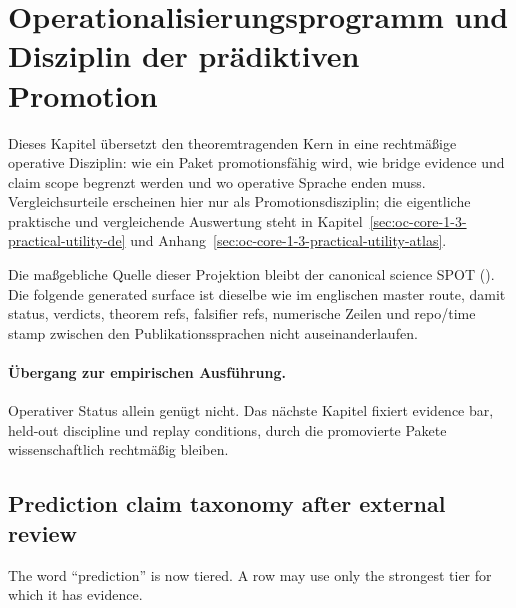 \section{Operationalisierungsprogramm und Disziplin der prädiktiven Promotion}
\label{sec:oc-core-1-3-operationalization-program-de}

Dieses Kapitel übersetzt den theoremtragenden Kern in eine rechtmäßige
operative Disziplin: wie ein Paket promotionsfähig wird, wie bridge evidence
und claim scope begrenzt werden und wo operative Sprache enden muss.
Vergleichsurteile erscheinen hier nur als Promotionsdisziplin; die eigentliche
praktische und vergleichende Auswertung steht in
Kapitel~\ref{sec:oc-core-1-3-practical-utility-de} und
Anhang~\ref{sec:oc-core-1-3-practical-utility-atlas}.

Die maßgebliche Quelle dieser Projektion bleibt der canonical science SPOT
(). Die folgende generated surface ist
dieselbe wie im englischen master route, damit status, verdicts, theorem refs,
falsifier refs, numerische Zeilen und repo/time stamp zwischen den
Publikationssprachen nicht auseinanderlaufen.

\begingroup
\small

\endgroup

\paragraph{Übergang zur empirischen Ausführung.}
Operativer Status allein genügt nicht. Das nächste Kapitel fixiert evidence
bar, held-out discipline und replay conditions, durch die promovierte Pakete
wissenschaftlich rechtmäßig bleiben.


\subsection{Prediction claim taxonomy after external review}
\label{sec:oc13-prediction-claim-taxonomy-v3}

The word ``prediction'' is now tiered. A row may use only the strongest tier for
which it has evidence.

